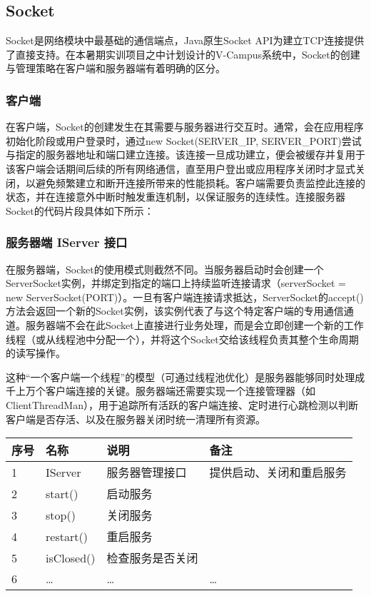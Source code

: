 \documentclass[a4paper]{ctexart}
\begin{document}
\subsection{Socket}
Socket是网络模块中最基础的通信端点，Java原生Socket API为建立TCP连接提供了直接支持。在本暑期实训项目之中计划设计的V-Campus系统中，Socket的创建与管理策略在客户端和服务器端有着明确的区分。
\subsubsection{客户端}
在客户端，Socket的创建发生在其需要与服务器进行交互时。通常，会在应用程序初始化阶段或用户登录时，通过new Socket(SERVER_IP, SERVER_PORT)尝试与指定的服务器地址和端口建立连接。该连接一旦成功建立，便会被缓存并复用于该客户端会话期间后续的所有网络通信，直至用户登出或应用程序关闭时才显式关闭，以避免频繁建立和断开连接所带来的性能损耗。客户端需要负责监控此连接的状态，并在连接意外中断时触发重连机制，以保证服务的连续性。连接服务器Socket的代码片段具体如下所示：

\begin{comment}
\begin{lstlisting}
// 连接服务器Socket
clientSocket = new Socket(SERVER_ADDRESS, SERVER_PORT);
\end{lstlisting}
\end{comment}


\subsubsection{服务器端 IServer 接口}
在服务器端，Socket的使用模式则截然不同。当服务器启动时会创建一个ServerSocket实例，并绑定到指定的端口上持续监听连接请求（serverSocket = new ServerSocket(PORT)）。一旦有客户端连接请求抵达，ServerSocket的accept()方法会返回一个新的Socket实例，该实例代表了与这个特定客户端的专用通信通道。服务器端不会在此Socket上直接进行业务处理，而是会立即创建一个新的工作线程（或从线程池中分配一个），并将这个Socket交给该线程负责其整个生命周期的读写操作。

这种“一个客户端一个线程”的模型（可通过线程池优化）是服务器能够同时处理成千上万个客户端连接的关键。服务器端还需要实现一个连接管理器（如ClientThreadMan），用于追踪所有活跃的客户端连接、定时进行心跳检测以判断客户端是否存活、以及在服务器关闭时统一清理所有资源。
\begin{tabular}{llll}
    \toprule
    \textbf{序号} & \textbf{名称} & \textbf{说明} & \textbf{备注}  \\
    \midrule
    1           & IServer     & 服务器管理接口     & 提供启动、关闭和重启服务 \\
    2           & start()     & 启动服务        &              \\
    3           & stop()      & 关闭服务        &              \\
    4           & restart()   & 重启服务        &              \\
    5           & isClosed()  & 检查服务是否关闭    &              \\
    6           & …           & …           & …            \\
    \bottomrule
\end{tabular}
\vspace{1em}
\end{document}
